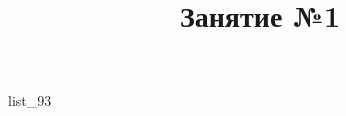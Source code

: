 \documentclass[12pt, a4paper]{article}
\begin{document}
	\title{Занятие №1}
	{list_93}
\end{document}
